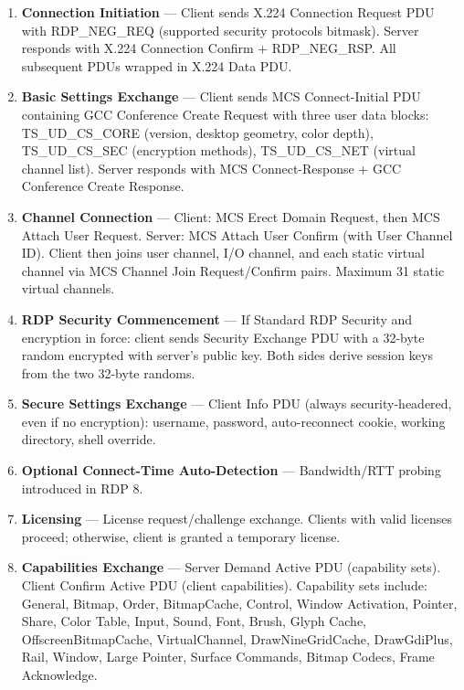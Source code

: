 \documentclass[11pt,letterpaper]{article}
\begin{document}
\begin{enumerate}[leftmargin=*, label=\textbf{Phase \arabic*.}]
\item \textbf{Connection Initiation} --- Client sends X.224 Connection Request PDU with RDP\_NEG\_REQ (supported security protocols bitmask). Server responds with X.224 Connection Confirm + RDP\_NEG\_RSP. All subsequent PDUs wrapped in X.224 Data PDU.

\item \textbf{Basic Settings Exchange} --- Client sends MCS Connect-Initial PDU containing GCC Conference Create Request with three user data blocks: TS\_UD\_CS\_CORE (version, desktop geometry, color depth), TS\_UD\_CS\_SEC (encryption methods), TS\_UD\_CS\_NET (virtual channel list). Server responds with MCS Connect-Response + GCC Conference Create Response.

\item \textbf{Channel Connection} --- Client: MCS Erect Domain Request, then MCS Attach User Request. Server: MCS Attach User Confirm (with User Channel ID). Client then joins user channel, I/O channel, and each static virtual channel via MCS Channel Join Request/Confirm pairs. Maximum 31 static virtual channels.

\item \textbf{RDP Security Commencement} --- If Standard RDP Security and encryption in force: client sends Security Exchange PDU with a 32-byte random encrypted with server's public key. Both sides derive session keys from the two 32-byte randoms.

\item \textbf{Secure Settings Exchange} --- Client Info PDU (always security-headered, even if no encryption): username, password, auto-reconnect cookie, working directory, shell override.

\item \textbf{Optional Connect-Time Auto-Detection} --- Bandwidth/RTT probing introduced in RDP 8.

\item \textbf{Licensing} --- License request/challenge exchange. Clients with valid licenses proceed; otherwise, client is granted a temporary license.

\item \textbf{Capabilities Exchange} --- Server Demand Active PDU (capability sets). Client Confirm Active PDU (client capabilities). Capability sets include: General, Bitmap, Order, BitmapCache, Control, Window Activation, Pointer, Share, Color Table, Input, Sound, Font, Brush, Glyph Cache, OffscreenBitmapCache, VirtualChannel, DrawNineGridCache, DrawGdiPlus, Rail, Window, Large Pointer, Surface Commands, Bitmap Codecs, Frame Acknowledge.


\end{enumerate}
\end{document}
